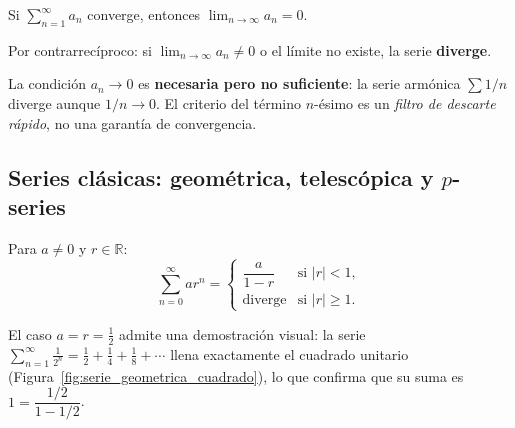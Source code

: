 \begin{theorem}
Si $\displaystyle\sum_{n=1}^\infty a_n$ converge, entonces
$\lim_{n\to\infty} a_n = 0$.

Por contrarrecíproco: si $\lim_{n\to\infty} a_n \neq 0$ o el límite no
existe, la serie \textbf{diverge}.
\end{theorem}

\begin{rem}
La condición $a_n \to 0$ es \textbf{necesaria pero no suficiente}: la
serie armónica $\sum 1/n$ diverge aunque $1/n \to 0$. El criterio del
término $n$-ésimo es un \emph{filtro de descarte rápido}, no una garantía
de convergencia.
\end{rem}

\subsection{Series clásicas: geométrica, telescópica y $p$-series}

\begin{theorem}
Para $a \neq 0$ y $r \in \mathbb{R}$:
\[
  \sum_{n=0}^\infty ar^n =
  \begin{cases}
    \dfrac{a}{1-r} & \text{si } |r| < 1, \\[4pt]
    \text{diverge} & \text{si } |r| \geq 1.
  \end{cases}
\]
\end{theorem}

El caso $a=r=\tfrac12$ admite una demostración visual: la serie
$\sum_{n=1}^\infty \tfrac{1}{2^n}=\tfrac12+\tfrac14+\tfrac18+\cdots$ llena
exactamente el cuadrado unitario (Figura~\ref{fig:serie_geometrica_cuadrado}),
lo que confirma que su suma es $1=\dfrac{1/2}{1-1/2}$.

